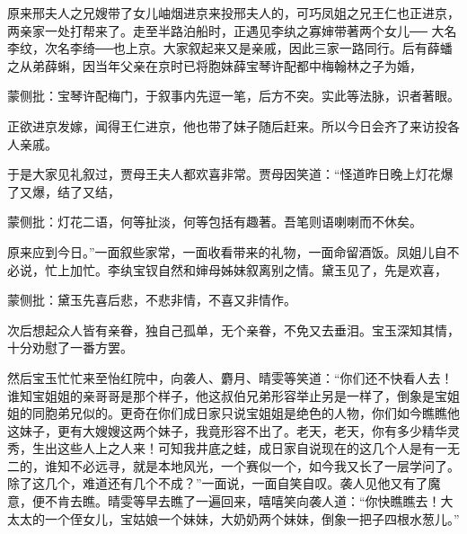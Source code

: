 \begin{parag}


    原来邢夫人之兄嫂带了女儿岫烟进京来投邢夫人的，可巧凤姐之兄王仁也正进京，两亲家一处打帮来了。走至半路泊船时，正遇见李纨之寡婶带著两个女儿── 大名李纹，次名李绮──也上京。大家叙起来又是亲戚，因此三家一路同行。后有薛蟠之从弟薛蝌，因当年父亲在京时已将胞妹薛宝琴许配都中梅翰林之子为婚，\begin{note}蒙侧批：宝琴许配梅门，于叙事内先逗一笔，后方不突。实此等法脉，识者著眼。\end{note}正欲进京发嫁，闻得王仁进京，他也带了妹子随后赶来。所以今日会齐了来访投各人亲戚。
\end{parag}


\begin{parag}


    于是大家见礼叙过，贾母王夫人都欢喜非常。贾母因笑道：“怪道昨日晚上灯花爆了又爆，结了又结，\begin{note}蒙侧批：灯花二语，何等扯淡，何等包括有趣著。吾笔则语喇喇而不休矣。\end{note}原来应到今日。”一面叙些家常，一面收看带来的礼物，一面命留酒饭。凤姐儿自不必说，忙上加忙。李纨宝钗自然和婶母姊妹叙离别之情。黛玉见了，先是欢喜，\begin{note}蒙侧批：黛玉先喜后悲，不悲非情，不喜又非情作。\end{note}次后想起众人皆有亲眷，独自己孤单，无个亲眷，不免又去垂泪。宝玉深知其情，十分劝慰了一番方罢。
\end{parag}


\begin{parag}


    然后宝玉忙忙来至怡红院中，向袭人、麝月、晴雯等笑道：“你们还不快看人去！谁知宝姐姐的亲哥哥是那个样子，他这叔伯兄弟形容举止另是一样了，倒象是宝姐姐的同胞弟兄似的。更奇在你们成日家只说宝姐姐是绝色的人物，你们如今瞧瞧他这妹子，更有大嫂嫂这两个妹子，我竟形容不出了。老天，老天，你有多少精华灵秀，生出这些人上之人来！可知我井底之蛙，成日家自说现在的这几个人是有一无二的，谁知不必远寻，就是本地风光，一个赛似一个，如今我又长了一层学问了。除了这几个，难道还有几个不成？”一面说，一面自笑自叹。袭人见他又有了魔意，便不肯去瞧。晴雯等早去瞧了一遍回来，嘻嘻笑向袭人道：“你快瞧瞧去！大太太的一个侄女儿，宝姑娘一个妹妹，大奶奶两个妹妹，倒象一把子四根水葱儿。”
\end{parag}


